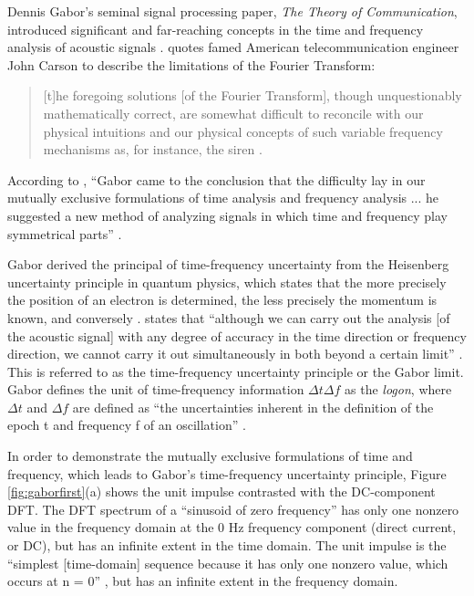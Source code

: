 \documentclass[report.tex]{subfiles}
\begin{document}
Dennis Gabor's seminal signal processing paper, \textit{The Theory of Communication}, introduced significant and far-reaching concepts in the time and frequency analysis of acoustic signals \parencite{gabor1946}. \citeauthor{gabor1946} quotes famed American telecommunication engineer John Carson \parencite{carsonfamous} to describe the limitations of the Fourier Transform:

\begin{quote}
	[t]he foregoing solutions [of the Fourier Transform], though unquestionably mathematically correct, are somewhat difficult to reconcile with our physical intuitions and our physical concepts of such variable frequency mechanisms as, for instance, the siren \parencite[431]{gabor1946}.
\end{quote}

According to \citeauthor{korpel}, ``Gabor came to the conclusion that the difficulty lay in our mutually exclusive formulations of time analysis and frequency analysis ... he suggested a new method of analyzing signals in which time and frequency play symmetrical parts'' \parencite[3624]{korpel}.

Gabor derived the principal of time-frequency uncertainty from the Heisenberg uncertainty principle in quantum physics, which states that the more precisely the position of an electron is determined, the less precisely the momentum is known, and conversely . \citeauthor{gabor1946} states that ``although we can carry out the analysis [of the acoustic signal] with any degree of accuracy in the time direction or frequency direction, we cannot carry it out simultaneously in both beyond a certain limit'' \parencite[432]{gabor1946}. This is referred to as the time-frequency uncertainty principle or the Gabor limit. Gabor defines the unit of time-frequency information $\Delta t \Delta f$ as the \textit{logon}, where $\Delta t$ and $\Delta f$ are defined as ``the uncertainties inherent in the definition of the epoch t and frequency f of an oscillation'' \parencite[432]{gabor1946}.

In order to demonstrate the mutually exclusive formulations of time and frequency, which leads to Gabor's time-frequency uncertainty principle, Figure \ref{fig:gaborfirst}(a) shows the unit impulse contrasted with the DC-component DFT. The DFT spectrum of a ``sinusoid of zero frequency'' \parencite[13]{dspfirst} has only one nonzero value in the frequency domain at the 0 Hz frequency component (direct current, or DC), but has an infinite extent in the time domain. The unit impulse is the ``simplest [time-domain] sequence because it has only one nonzero value, which occurs at n = 0'' \parencite[107]{dspfirst}, but has an infinite extent in the frequency domain.
\end{document}

